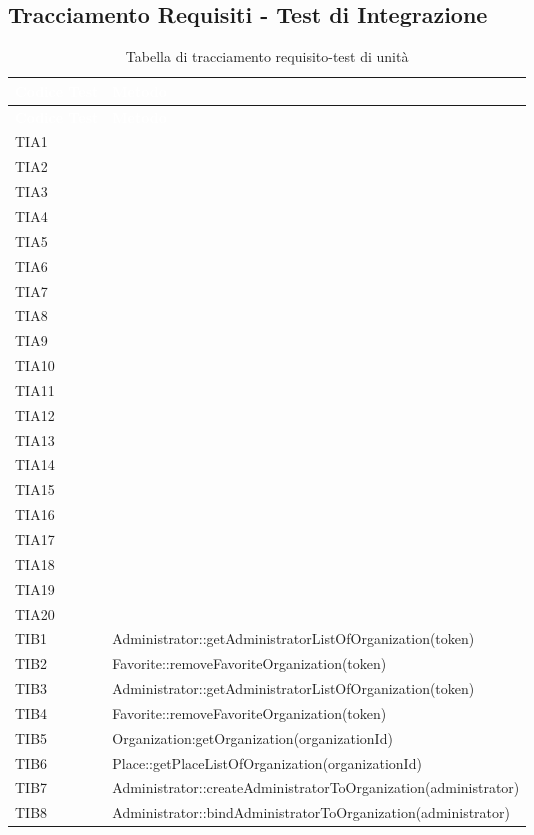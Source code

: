 \subsection{Tracciamento Requisiti - Test di Integrazione}
{
	\renewcommand{\arraystretch}{1.5}
	\centering
	\begin{longtable}{C{2cm} C{12cm}}
	\caption{Tabella di tracciamento requisito-test di unità}\\
	\textcolor{white}{\textbf{Codice Test}} & \textcolor{white}{\textbf{Metodo}}\\	
	\endfirsthead
	\textcolor{white}{\textbf{Codice Test}} & \textcolor{white}{\textbf{Metodo}}\\	
	\endhead
	
	TIA1 &  \\
	TIA2 &  \\
	TIA3 &  \\
	TIA4 &  \\
	TIA5 &  \\
	TIA6 &  \\
	TIA7 &  \\
	TIA8 &  \\
	TIA9 &  \\
	TIA10 &  \\
	TIA11 &  \\
	TIA12 &  \\
	TIA13 &  \\
	TIA14 &  \\
	TIA15 &  \\
	TIA16 &  \\
	TIA17 &  \\
	TIA18 &  \\
	TIA19 &  \\
	TIA20 &  \\
	TIB1 & Administrator::getAdministratorListOfOrganization(token) \\
	TIB2 & Favorite::removeFavoriteOrganization(token)  \\
	TIB3 & Administrator::getAdministratorListOfOrganization(token)  \\
	TIB4 & Favorite::removeFavoriteOrganization(token) \\
	TIB5 & Organization:getOrganization(organizationId) \\
	TIB6 & Place::getPlaceListOfOrganization(organizationId) \\
	TIB7 & Administrator::createAdministratorToOrganization(administrator) \\
	TIB8 & Administrator::bindAdministratorToOrganization(administrator) \\

\end{longtable}}
